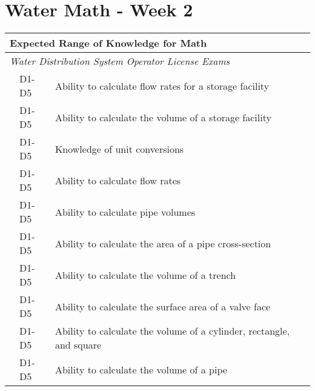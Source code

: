 \chapter{Water Math - Week 2}



\begin{table}[H]
\begin{tabular}{| m{1cm} | m{1cm} | m{12cm} |}
\hline
\multicolumn{3}{|l|}{\textbf{Expected   Range of Knowledge for Math}}                                                                      \\ \hline
\multicolumn{3}{|l|}{\textit{Water   Distribution System Operator License Exams}}                                                          \\ \hline
\multicolumn{1}{l|}{} & \multicolumn{1}{l|}{D1-D5} & Ability to calculate   flow rates for a storage facility                     \\ \cline{2-3} 
\multicolumn{1}{l|}{} & \multicolumn{1}{l|}{D1-D5} & Ability to calculate   the volume of a storage facility                      \\ \cline{2-3} 
\multicolumn{1}{l|}{} & \multicolumn{1}{l|}{D1-D5} & Knowledge of unit   conversions                                              \\ \cline{2-3} 
\multicolumn{1}{l|}{} & \multicolumn{1}{l|}{D1-D5} & Ability to calculate   flow rates                                            \\ \cline{2-3} 
\multicolumn{1}{l|}{} & \multicolumn{1}{l|}{D1-D5} & Ability to calculate   pipe volumes                                          \\ \cline{2-3} 
\multicolumn{1}{l|}{} & \multicolumn{1}{l|}{D1-D5} & Ability to calculate   the area of a pipe cross-section                      \\ \cline{2-3}
\multicolumn{1}{l|}{} & \multicolumn{1}{l|}{D1-D5} & Ability to calculate   the volume of a trench                                \\ \cline{2-3}  
\multicolumn{1}{l|}{} & \multicolumn{1}{l|}{D1-D5} & Ability to calculate   the surface area of a valve face                      \\ \cline{2-3} 
\multicolumn{1}{l|}{} & \multicolumn{1}{l|}{D1-D5} & Ability to calculate   the volume of a cylinder, rectangle, and square       \\ \cline{2-3} 
\multicolumn{1}{l|}{} & \multicolumn{1}{l|}{D1-D5} & Ability to calculate   the volume of a pipe                                  \\ \cline{2-3} 

\end{tabular}
\end{table}
